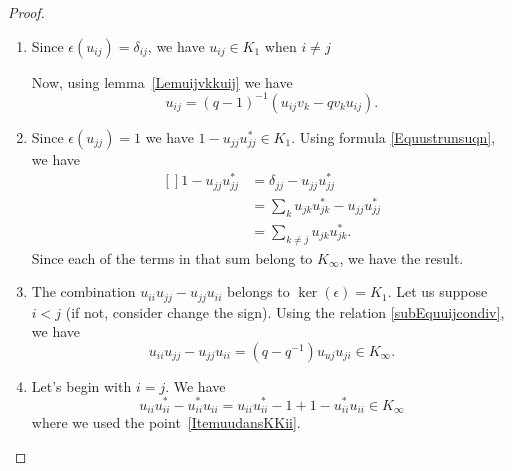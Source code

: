 \begin{proof}
	\begin{enumerate}
		\item
		      Since $\epsilon(u_{ij})=\delta_{ij}$, we have $u_{ij}\in K_1$ when $i\neq j$

		      Now, using lemma~\ref{Lemuijvkkuij} we have
		      \begin{equation}
			      u_{ij}=(q-1)^{-1}(u_{ij}v_k-qv_ku_{ij}).
		      \end{equation}
		\item
		      Since $\epsilon(u_{jj})=1$ we have $1-u_{jj}u_{jj}^*\in K_1$. Using formula \eqref{Equustrunsuqn}, we have
		      \begin{equation}
			      \begin{aligned}[]
				      1-u_{jj}u_{jj}^* & =\delta_{jj}-u_{jj}u_{jj}^*          \\
				                       & =\sum_ku_{jk}u_{jk}^*-u_{jj}u_{jj}^* \\
				                       & =\sum_{k\neq j}u_{jk}u_{jk}^*.
			      \end{aligned}
		      \end{equation}
		      Since each of the terms in that sum belong to $K_{\infty}$, we have the result.
		\item
		      The combination $u_{ii}u_{jj}-u_{jj}u_{ii}$ belongs to $\ker(\epsilon)=K_1$. Let us suppose $i<j$ (if not, consider change the sign). Using the relation \eqref{subEquuijcondiv}, we have
		      \begin{equation}
			      u_{ii}u_{jj}-u_{jj}u_{ii}=(q-q^{-1})u_{uj}u_{ji}\in K_{\infty}.
		      \end{equation}
		\item
		      Let's begin with $i=j$. We have
		      \begin{equation}
			      u_{ii}u_{ii}^*-u_{ii}^*u_{ii}=u_{ii}u_{ii}^*-1+1-u_{ii}^*u_{ii}\in K_{\infty}
		      \end{equation}
		      where we used the point~\ref{ItemuudansKKii}.


\end{enumerate}
\end{proof}
